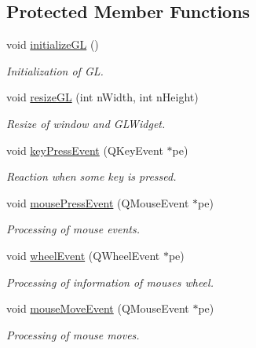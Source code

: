 \subsection*{Protected Member Functions}
\begin{DoxyCompactItemize}
\item 
\mbox{\label{class_scene3_d_a95b6cf07058cff64f42127f83c01a3a8}} 
void \hyperlink{class_scene3_d_a95b6cf07058cff64f42127f83c01a3a8}{initialize\+GL} ()
\begin{DoxyCompactList}\small\item\em Initialization of GL. \end{DoxyCompactList}\item 
void \hyperlink{class_scene3_d_ab0541e5e74ceef7a33a54cd48f213ea1}{resize\+GL} (int n\+Width, int n\+Height)
\begin{DoxyCompactList}\small\item\em Resize of window and G\+L\+Widget. \end{DoxyCompactList}\item 
void \hyperlink{class_scene3_d_afb03a7f38030112d169bf46b77b75cb7}{key\+Press\+Event} (Q\+Key\+Event $\ast$pe)
\begin{DoxyCompactList}\small\item\em Reaction when some key is pressed. \end{DoxyCompactList}\item 
void \hyperlink{class_scene3_d_aab704c7ab690b08003db9fa0b986c8b2}{mouse\+Press\+Event} (Q\+Mouse\+Event $\ast$pe)
\begin{DoxyCompactList}\small\item\em Processing of mouse events. \end{DoxyCompactList}\item 
void \hyperlink{class_scene3_d_a53e06f80bbe9a6db3979ba050055ff8c}{wheel\+Event} (Q\+Wheel\+Event $\ast$pe)
\begin{DoxyCompactList}\small\item\em Processing of information of mouse\textquotesingle{}s wheel. \end{DoxyCompactList}\item 
\mbox{\label{class_scene3_d_affe91c91b89ad74d09c81906cd15cd69}} 
void \hyperlink{class_scene3_d_affe91c91b89ad74d09c81906cd15cd69}{mouse\+Move\+Event} (Q\+Mouse\+Event $\ast$pe)
\begin{DoxyCompactList}\small\item\em Processing of mouse moves. \end{DoxyCompactList}\end{DoxyCompactItemize}


